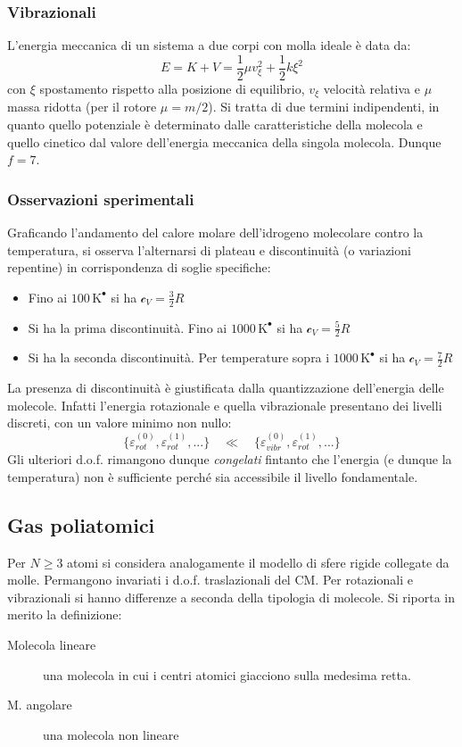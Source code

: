 \documentclass[10pt, oneside]{book}
\newcommand{\kelvin}[1]{\, \mathrm{K^{#1}}}
\newcommand{\ds}{\displaystyle}
\newcommand{\molhtv}{\mathcal{c}_V }
\begin{document}
\subsubsection*{Vibrazionali}
L'energia meccanica di un sistema a due corpi con molla ideale è data da:
\[E = K + V = \frac{1}{2}\mu v_{\xi}^2 + \frac{1}{2}k \xi^2\]
con $\xi$ spostamento rispetto alla posizione di equilibrio, $\ds v_\xi$ velocità relativa e $\mu$ massa ridotta (per il rotore $\ds \mu = m/2$). Si tratta di due termini indipendenti, in quanto quello potenziale è determinato dalle caratteristiche della molecola e quello cinetico dal valore dell'energia meccanica della singola molecola. Dunque $f = 7$.\\

\subsubsection*{Osservazioni sperimentali}
Graficando l'andamento del calore molare dell'idrogeno molecolare contro la temperatura, si osserva l'alternarsi di plateau e discontinuità (o variazioni repentine) in corrispondenza di soglie specifiche:
\begin{itemize}
\item Fino ai $100 \kelvin{•}$ si ha $\ds \molhtv = \frac{3}{2} R$
\item Si ha la prima discontinuità. Fino ai $1000 \kelvin{•}$ si ha $\ds \molhtv = \frac{5}{2} R$
\item Si ha la seconda discontinuità. Per temperature sopra i $1000 \kelvin{•}$ si ha $\ds \molhtv = \frac{7}{2} R$
\end{itemize}
La presenza di discontinuità è giustificata dalla quantizzazione dell'energia delle molecole. Infatti l'energia rotazionale e quella vibrazionale presentano dei livelli discreti, con un valore minimo non nullo:
\[\{\varepsilon_{rot}^{(0)}, \varepsilon_{rot}^{(1)}, ...\} \quad \ll \quad \{\varepsilon_{vibr}^{(0)}, \varepsilon_{rot}^{(1)}, ...\}\]
Gli ulteriori d.o.f. rimangono dunque \textit{congelati} fintanto che l'energia (e dunque la temperatura) non è sufficiente perché sia accessibile il livello fondamentale.

\subsection{Gas poliatomici}
Per $N \geq 3$ atomi si considera analogamente il modello di sfere rigide collegate da molle. Permangono invariati i d.o.f. traslazionali del CM. Per rotazionali e vibrazionali si hanno differenze a seconda della tipologia di molecole. Si riporta in merito la definizione:
\begin{description}
\item[Molecola lineare] una molecola in cui i centri atomici giacciono sulla medesima retta.
\item[M. angolare] una molecola non lineare
\end{description}
\end{document}
